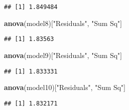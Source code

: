 \documentclass[
]{article}
\newenvironment{Shaded}{\begin{snugshade}}{\end{snugshade}}
\newcommand{\KeywordTok}[1]{\textcolor[rgb]{0.13,0.29,0.53}{\textbf{#1}}}
\newcommand{\NormalTok}[1]{#1}
\newcommand{\StringTok}[1]{\textcolor[rgb]{0.31,0.60,0.02}{#1}}
\begin{document}
\begin{verbatim}
## [1] 1.849484
\end{verbatim}

\begin{Shaded}
\begin{Highlighting}[]
\KeywordTok{anova}\NormalTok{(model8)[}\StringTok{"Residuals"}\NormalTok{, }\StringTok{"Sum Sq"}\NormalTok{]}
\end{Highlighting}
\end{Shaded}

\begin{verbatim}
## [1] 1.83563
\end{verbatim}

\begin{Shaded}
\begin{Highlighting}[]
\KeywordTok{anova}\NormalTok{(model9)[}\StringTok{"Residuals"}\NormalTok{, }\StringTok{"Sum Sq"}\NormalTok{]}
\end{Highlighting}
\end{Shaded}

\begin{verbatim}
## [1] 1.833331
\end{verbatim}

\begin{Shaded}
\begin{Highlighting}[]
\KeywordTok{anova}\NormalTok{(model10)[}\StringTok{"Residuals"}\NormalTok{, }\StringTok{"Sum Sq"}\NormalTok{]}
\end{Highlighting}
\end{Shaded}

\begin{verbatim}
## [1] 1.832171
\end{verbatim}
\end{document}
